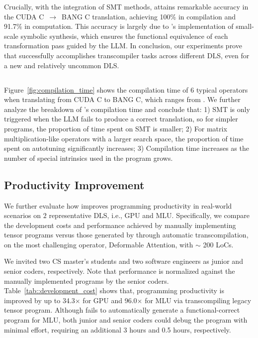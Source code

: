 Crucially, with the integration of SMT methods, \name{} attains remarkable accuracy in the CUDA C~$\rightarrow$~BANG C translation, achieving 100\% in compilation and 91.7\% in computation. This accuracy is largely due to \name{}'s implementation of small-scale symbolic synthesis, which ensures the functional equivalence of each transformation pass guided by the LLM. 
In conclusion, our experiments prove that \name{} successfully accomplishes transcompiler tasks across different DLS, even for a new and relatively uncommon DLS.


\vspace{-15pt}
\subsection{}
Figure~\ref{fig:compilation_time} shows the compilation time of 6 typical operators when translating from CUDA C to BANG C, which ranges from .
We further analyze the breakdown of \name{}'s compilation time and conclude that: 1) SMT is only triggered when the LLM fails to produce a correct translation, so for simpler programs, the proportion of time spent on SMT is smaller; 2) For matrix multiplication-like operators with a larger search space, the proportion of time spent on autotuning significantly increases; 3) Compilation time increases as the number of special intrinsics used in the program grows.


\vspace{-15pt}
\subsection{Productivity Improvement}
We further evaluate how \name{} improves programming productivity in real-world scenarios on $2$ representative DLS, i.e., GPU and MLU.
Specifically, we compare the development costs and performance achieved by manually implementing tensor programs versus those generated by \name{} through automatic transcompilation, on the most challenging operator, Deformable Attention, with $\sim$ 200 LoCs.

We invited two CS master's students and two software engineers as junior and senior coders, respectively. Note that performance is normalized against the manually implemented programs by the senior coders.
Table~\ref{tab::development_cost} shows that, programming productivity is improved by up to 34.3$\times$ for GPU and 96.0$\times$ for MLU via transcompiling legacy tensor program.
Although \name{} fails to automatically generate a functional-correct program for MLU, both junior and senior coders could debug the program with minimal effort, requiring an additional 3 hours and 0.5 hours, respectively. 

